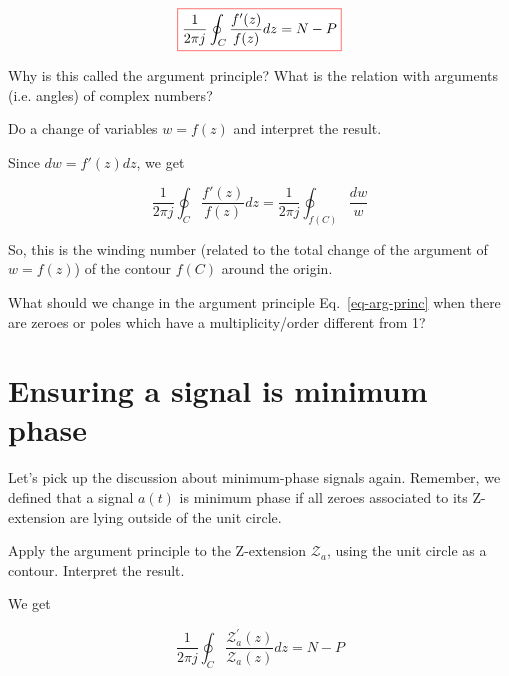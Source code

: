 \begin{equation}
\fbox{$\displaystyle
\frac{1}{2 \pi j }\oint_C \frac{f'(z)}{f(z)} dz = N-P
$}
\label{eq-arg-princ}
\end{equation}

\pagebreak

Why is this called the argument principle? What is the relation with arguments (i.e. angles) of complex numbers?

\begin{cue}
Do a change of variables $w=f(z)$ and interpret the result.   
\end{cue}

Since $dw = f'(z) dz$, we get

\begin{equation}
\frac{1}{2 \pi j }\oint_C \frac{f'(z)}{f(z)} dz = \frac{1}{2 \pi j }\oint_{f(C)} \frac{dw}{w}
\label{eq-arg-principle-winding}
\end{equation}

\noindent{}So, this is the winding number (related to the total change of the argument of $w=f(z)$) of the contour $f(C)$ around the origin. 

\begin{exer}
What should we change in the argument principle Eq.~\ref{eq-arg-princ} when there are zeroes or poles which have a multiplicity/order different from 1?
\end{exer}


\pagebreak


\section{Ensuring a signal is minimum phase}

Let's pick up the discussion about minimum-phase signals again. Remember, we defined that a signal $a(t)$ is minimum phase if all zeroes associated to its Z-extension are lying outside of the unit circle.

\begin{cue}
Apply the argument principle to the Z-extension $\mathcal{Z}_a$, using the unit circle as a contour. Interpret the result. 
\end{cue}

We get

\begin{equation}
\frac{1}{2 \pi j }\oint_C \frac{\mathcal{Z}_a^{'}(z)}{\mathcal{Z}_a(z)} dz = N-P
\end{equation}

